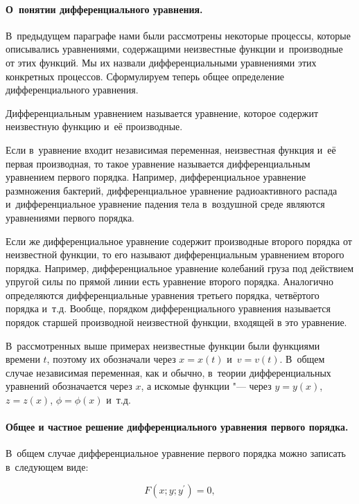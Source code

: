 
\paragraph{О~понятии дифференциального уравнения.}
В~предыдущем параграфе нами были рассмотрены некоторые процессы,
которые описывались уравнениями, содержащими неизвестные функции
и~производные от этих функций. Мы их назвали дифференциальными уравнениями этих
конкретных процессов. Сформулируем теперь общее определение дифференциального уравнения.

\begin{Def}
Дифференциальным уравнением называется уравнение, которое содержит неизвестную функцию
и~её производные.
\end{Def}
Если в~уравнение входит независимая переменная, неизвестная функция
и~её первая производная, то такое уравнение называется дифференциальным уравнением
первого порядка.
Например, дифференциальное уравнение размножения бактерий, дифференциальное
уравнение радиоактивного распада и~дифференциальное уравнение падения тела
в~воздушной среде являются уравнениями первого порядка.

Если же дифференциальное уравнение содержит производные второго порядка от
неизвестной функции, то его называют дифференциальным уравнением второго порядка.
Например, дифференциальное уравнение  колебаний груза под действием упругой силы
по прямой линии есть уравнение второго порядка. Аналогично определяются
дифференциальные уравнения третьего порядка, четвёртого порядка и~т.д.
Вообще, порядком дифференциального уравнения называется порядок старшей производной
неизвестной функции, входящей в это уравнение.

В~рассмотренных выше примерах неизвестные функции были функциями времени $t$,
поэтому их обозначали через $x = x(t)$ и~$v = v(t)$. В~общем случае независимая
переменная, как и обычно, в~теории дифференциальных уравнений обозначается
через $x$, а искомые функции "--- через $y = y(x)$, $z = z(x)$, $\phi = \phi(x)$
и~т.д.

\paragraph{Общее и частное решение дифференциального уравнения первого порядка.}
В~общем случае дифференциальное уравнение первого порядка можно записать
в~следующем виде:

\begin{equation}\label{eq:6_2_1}
F(x; y; y^\prime) = 0,
\end{equation}

